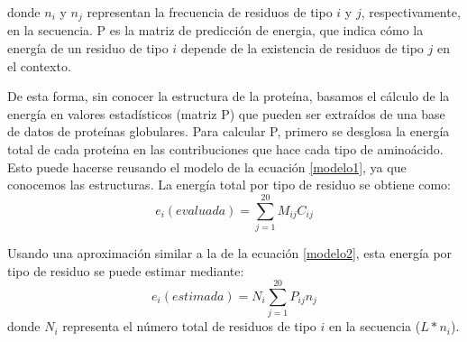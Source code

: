 \noindent donde $n_i$ y $n_j$ representan la frecuencia de residuos de tipo $i$ y $j$, respectivamente, en la secuencia.
P es la matriz de predicción de energia, que indica cómo la energía de un residuo de tipo $i$ depende de la existencia de residuos de tipo $j$ en el contexto.



De esta forma, sin conocer la estructura de la proteína, basamos el cálculo de la energía en valores estadísticos (matriz P) que pueden ser extraídos de una base de datos de proteínas globulares.
Para calcular P, primero se desglosa la energía total de cada proteína en las contribuciones que hace cada tipo de aminoácido.
Esto puede hacerse reusando el modelo de la ecuación \ref{modelo1}, ya que conocemos las estructuras. 
La energía total por tipo de residuo se obtiene como:
\begin{equation}\label{ek1}
  e_i(evaluada)= \sum_{j=1}^{20} M_{ij}C_{ij}
\end{equation}

Usando una aproximación similar a la de la ecuación \ref{modelo2}, esta energía por tipo de residuo se puede estimar mediante:
\begin{equation}\label{ek2}
e_i(estimada) = N_i\sum_{j=1}^{20} P_{ij}n_{j}
\end{equation}
\noindent donde $N_i$ representa el número total de residuos de tipo $i$ en la secuencia ($L*n_i$).

